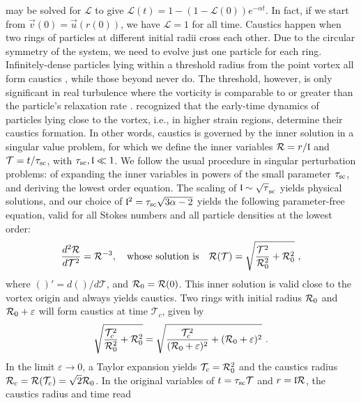 \documentclass[../Rajarshi-thesis-draft.tex]{subfiles}
\begin{document}
  may be solved for $\mathscr{L}$ to give $\mathscr{L}(t) = 1 - (1 - \mathscr{L}(0))e^{-\alpha t}$. In fact, if we start from $\vec{v}(0) = \vec{u}(r(0))$, we have $\mathscr{L} = 1$ for all time. Caustics happen when two rings of particles at different initial radii cross each other. Due to the circular symmetry of the system, we need to evolve just one particle for each ring. Infinitely-dense particles lying within a threshold radius from the point vortex all form caustics \cite{ravichandran2022}, while those beyond never do. The threshold, however, is only significant in real turbulence where the vorticity is comparable to or greater than the particle's relaxation rate \cite{ling2013}. \citet{ravichandran2015} recognized that the early-time dynamics of particles lying close to the vortex, i.e., in higher strain regions, determine their caustics formation. In other words, caustics is governed by the inner solution in a singular value problem, for which we define the inner variables $ \mathcal{R}= r/\mathfrak{l} $ and $\mathcal{T} = t/\tau_{\rm sc}$, with $\tau_{\rm sc}, \mathfrak{l} \ll 1$.
We follow the usual procedure in singular perturbation problems: of expanding the inner variables in powers of the small parameter $\tau_{\rm sc}$, and deriving the lowest order equation. The scaling of $\mathfrak{l} \sim \sqrt\tau_{\rm sc}$ \cite{deepu2017} yields physical solutions, and our choice of
$\mathfrak{l}^2 = \tau_{\rm sc}\sqrt{3\alpha -2}$ yields the following parameter-free equation, valid for all Stokes numbers and all particle densities at the lowest order:
\begin{equation}
   \frac{d^2\mathcal{R}}{d\mathcal{T}^2} = \mathcal{R}^{-3},
\quad {\rm whose \ solution \ is} \quad
\mathcal{R}(\mathcal{T}) = \sqrt{\frac{\mathcal{T}^2}{\mathcal{R}_0^2}+\mathcal{R}_0^2} \ ,
      \end{equation}
  where $()' = d()/d\mathcal{T}$, and $\mathcal{R}_0 = \mathcal{R}(0)$. This inner solution is valid close to the vortex origin and always yields caustics. Two rings with initial radius $\mathcal{R}_0$ and $\mathcal{R}_0 + \varepsilon$ will form caustics at time $\mathcal{T}_c$, given by
  \begin{align}
  \begin{split}
      \sqrt{\frac{\mathcal{T}_c^2}{\mathcal{R}_0^2}+ \mathcal{R}_0^2} = \sqrt{\frac{\mathcal{T}_c^2}{(\mathcal{R}_0 +\varepsilon)^2}+ (\mathcal{R}_0 +\varepsilon)^2} \ .
  \end{split}
  \end{align}
  In the limit $\varepsilon \to 0$, a Taylor expansion yields $\mathcal{T}_c = \mathcal{R}_0^2$  and the caustics radius $\mathcal{R}_c = \mathcal{R}(\mathcal{T}_c)= \sqrt{2}\mathcal{R}_0$. In the original variables of $t = \tau_{\rm sc} \mathcal{T}$ and $r = \mathfrak{l} \mathcal{R}$, the caustics radius and time read
\end{document}
